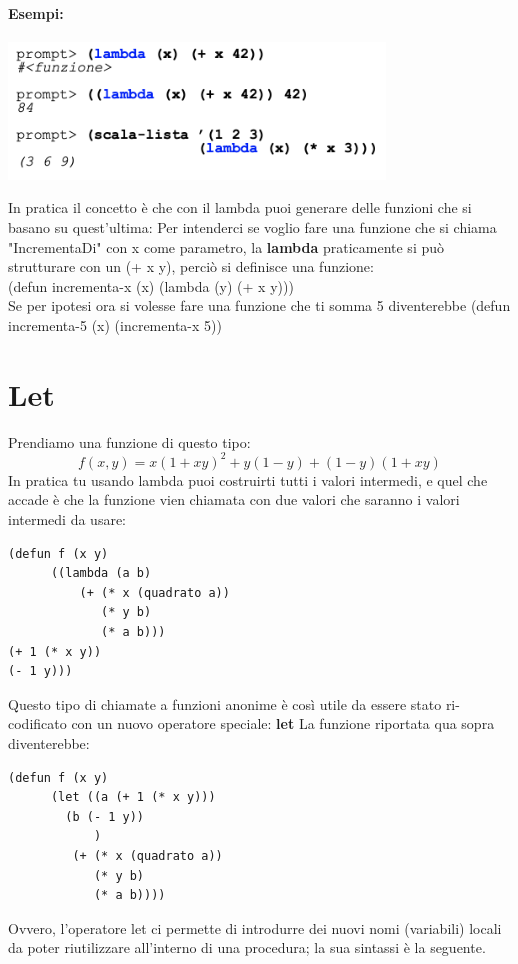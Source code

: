 \documentclass[12pt, a4paper, openany, oneside]{book}
\begin{document}
\paragraph{Esempi: }
\begin{center}
\includegraphics[width=0.75\textwidth]{22}
\end{center}
In pratica il concetto è che con il lambda puoi generare delle funzioni che 
si basano su quest'ultima: Per intenderci se voglio fare una funzione che si 
chiama "IncrementaDi" con x come parametro, la \textbf{lambda} praticamente 
si può strutturare con un (+ x y), perciò si definisce una funzione:\\
(defun incrementa-x (x) 
	(lambda (y) (+ x y)))\\
Se per ipotesi ora si volesse fare una funzione che ti somma 5 diventerebbe
(defun incrementa-5 (x) (incrementa-x 5))
\section{Let}
Prendiamo una funzione di questo tipo:
\[
	f(x, y) = x(1+xy)^{2}+y(1-y)+(1-y)(1+xy)
\]	
In pratica tu usando lambda puoi costruirti tutti i valori intermedi, e quel che
accade è che la funzione vien chiamata con due valori che saranno i valori 
intermedi da usare:
\begin{lstlisting}[language=LISP]
(defun f (x y)
      ((lambda (a b)
          (+ (* x (quadrato a))
             (* y b)
             (* a b)))
(+ 1 (* x y))
(- 1 y)))	
\end{lstlisting}
Questo tipo di chiamate a funzioni anonime è così utile da essere stato ri-codificato
con un nuovo operatore speciale: \textbf{let}
La funzione riportata qua sopra diventerebbe: 
\begin{lstlisting}[language=LISP]
(defun f (x y)
      (let ((a (+ 1 (* x y)))
		(b (- 1 y))
            )
         (+ (* x (quadrato a))
            (* y b)
            (* a b))))
\end{lstlisting}
Ovvero, l’operatore let ci permette di introdurre dei nuovi nomi (variabili) 
locali da poter riutilizzare all’interno di una procedura; la sua sintassi è la 
seguente.
\end{document}
